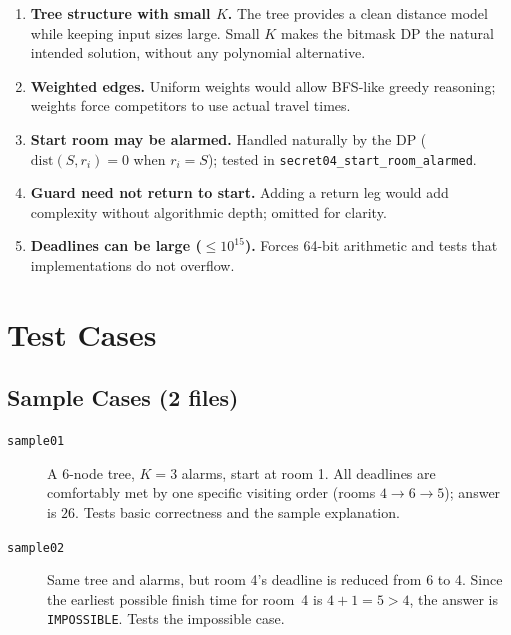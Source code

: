\documentclass[11pt]{article}
\begin{document}
\begin{enumerate}
  \item \textbf{Tree structure with small $K$.}  The tree provides a clean
        distance model while keeping input sizes large.  Small $K$ makes the
        bitmask DP the natural intended solution, without any polynomial
        alternative.

  \item \textbf{Weighted edges.}  Uniform weights would allow BFS-like greedy
        reasoning; weights force competitors to use actual travel times.

  \item \textbf{Start room may be alarmed.}  Handled naturally by the DP
        ($\mathrm{dist}(S,r_i)=0$ when $r_i=S$); tested in
        \texttt{secret04\_start\_room\_alarmed}.

  \item \textbf{Guard need not return to start.}  Adding a return leg would
        add complexity without algorithmic depth; omitted for clarity.

  \item \textbf{Deadlines can be large ($\le10^{15}$).}  Forces 64-bit
        arithmetic and tests that implementations do not overflow.
\end{enumerate}

\section*{Test Cases}

\subsection*{Sample Cases (2 files)}

\begin{description}
  \item[\texttt{sample01}] A 6-node tree, $K=3$ alarms, start at room 1.
        All deadlines are comfortably met by one specific visiting order
        (rooms $4\to6\to5$); answer is $26$.
        Tests basic correctness and the sample explanation.

  \item[\texttt{sample02}] Same tree and alarms, but room 4's deadline is
        reduced from 6 to 4.  Since the earliest possible finish time for
        room~4 is $4+1=5>4$, the answer is \texttt{IMPOSSIBLE}.
        Tests the impossible case.
\end{description}
\end{document}
